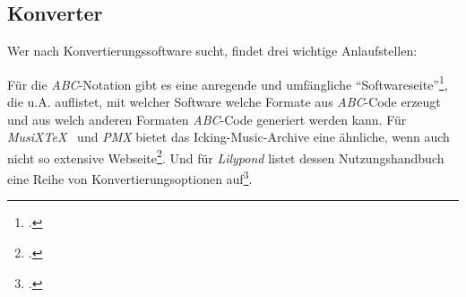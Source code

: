 %
%
%



\subsection{Konverter}

Wer nach Konvertierungssoftware sucht, findet drei wichtige Anlaufstellen:

Für die \textit{ABC}-Notation gibt es eine anregende und umfängliche
\enquote{Softwareseite}\footcite[vgl.][\nopage wp]{Abc2018b}, die u.A.
auflistet, mit welcher Software welche Formate aus \textit{ABC}-Code erzeugt und
aus welch anderen Formaten \textit{ABC}-Code generiert werden kann. Für
\textit{MusiX\TeX\ } und \textit{PMX} bietet das Icking-Music-Archive eine ähnliche,
wenn auch nicht so extensive Webseite\footcite[vgl.][\nopage wp]{Tennent2018b}.
Und für \textit{Lilypond} listet dessen Nutzungshandbuch eine Reihe von
Konvertierungsoptionen auf\footcite[vgl.][42ff]{iLilyPond2018e}.

